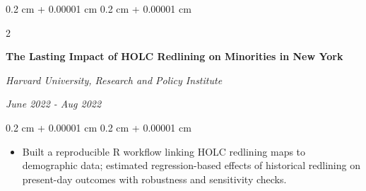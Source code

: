 \documentclass[10pt, letterpaper]{article}
\newenvironment{highlights}{
    \begin{itemize}[
        topsep=0.05 cm,
        parsep=0.05 cm,
        partopsep=0pt,
        itemsep=0pt,
        leftmargin=0.4 cm + 10pt
    ]
}{
    \end{itemize}
} %
\newenvironment{onecolentry}{
    \begin{adjustwidth}{
        0.2 cm + 0.00001 cm
    }{
        0.2 cm + 0.00001 cm
    }
}{
    \end{adjustwidth}
} %
\newenvironment{twocolentry}[2][]{
    \onecolentry
    \def\secondColumn{#2}
    \setcolumnwidth{\fill, 4.5 cm}
    \begin{paracol}{2}
}{
    \switchcolumn \raggedleft \secondColumn
    \end{paracol}
    \endonecolentry
} %
\begin{document}
        \vspace{0.05 cm}
        \begin{twocolentry}{
        \textit{June 2022 - Aug 2022}}
            \textbf{The Lasting Impact of HOLC Redlining on Minorities in New York}

            \textit{Harvard University, Research and Policy Institute}
        \end{twocolentry}
        \vspace{0.05 cm}
        \begin{onecolentry}
            \begin{highlights}
                \item Built a reproducible R workflow linking HOLC redlining maps to demographic data; estimated regression-based effects of historical redlining on present-day outcomes with robustness and sensitivity checks.
            \end{highlights}
        \end{onecolentry}
        



\end{document}
